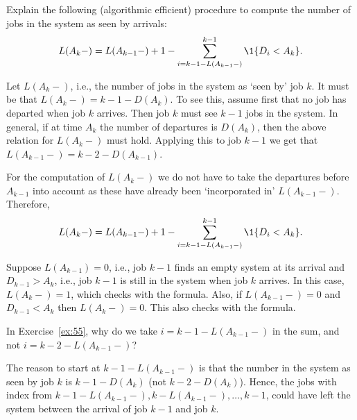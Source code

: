 \begin{exercise}\label{ex:55}
  Explain the following (algorithmic efficient) procedure to compute the number of jobs in the system as seen by arrivals:
  \begin{equation*}
    L(A_k-) = L(A_{k-1}-)+1 - \sum_{i= k-1 - L(A_{k-1}-)}^{k-1} \1{D_i< A_k}.
  \end{equation*}
\begin{solution}
  Let $ L(A_{k}-)$, i.e., the number of jobs in the system as
  `seen by' job $k$. It must be that $L(A_{k}-)=k-1 - D(A_{k})$. To see
  this, assume first that no job has departed when job $k$
  arrives. Then job $k$ must see $k-1$ jobs in the system. In general,
  if at time $A_k$ the number of departures is $D(A_k)$, then the
  above relation for $L(A_k-)$ must hold. Applying this to job $k-1$ we get that $L(A_{k-1}-) = k-2 - D(A_{k-1})$. 

  For the computation of $L(A_k-)$ we do not have to take the departures
  before $A_{k-1}$ into account as these have already been
  `incorporated in' $L(A_{k-1}-)$.  Therefore,
  \begin{equation*}
    L(A_k-) = L(A_{k-1}-) + 1 - \sum_{i= k-1 - L(A_{k-1}-)}^{k-1} \1{D_i< A_k}.
  \end{equation*}

    Suppose $L(A_{k-1})=0$, i.e., job $k-1$ finds an empty system at its
    arrival and $D_{k-1}>A_{k}$, i.e., job $k-1$ is still in the
    system when job $k$ arrives. In this case, $L(A_{k}-)=1$, which checks
    with the formula.  Also, if $L(A_{k-1}-)=0$ and $D_{k-1}< A_k$ then
    $L(A_k-) = 0$. This also checks with the formula. 

\end{solution}
\end{exercise}


\begin{extra}
  In Exercise~\ref{ex:55},   why do we take $i=k-1-L(A_{k-1}-)$ in  the sum, and not $i=k-2-L(A_{k-1}-)$?
  \begin{solution}
    The reason to start at $k-1-L(A_{k-1}-)$ is that the number in the
    system as seen by job $k$ is $k-1 - D(A_k)$ (not
    $k-2-D(A_k)$). Hence, the jobs with index from
    $k-1-L(A_{k-1}-), k-L(A_{k-1}-), \ldots, k-1$, could have left the system
    between the arrival of job $k-1$ and job $k$.
  \end{solution}
\end{extra}




